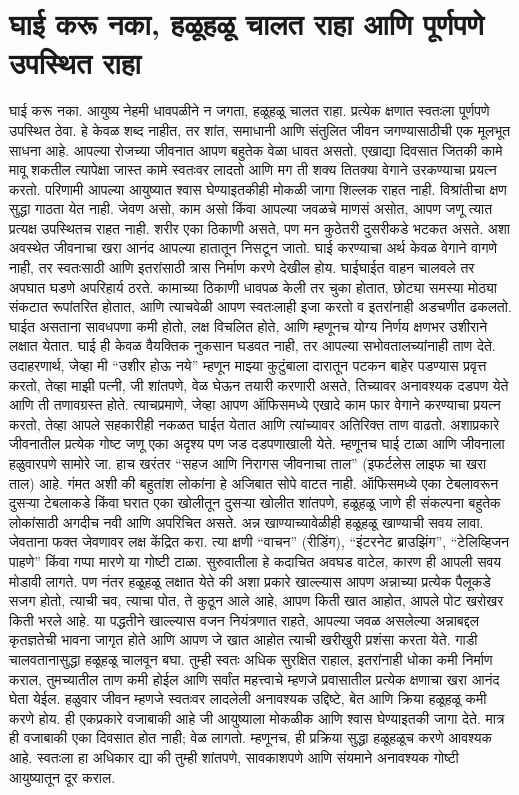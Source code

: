  \chapter{घाई करू नका, हळूहळू चालत राहा आणि पूर्णपणे उपस्थित राहा}
घाई करू नका. आयुष्य नेहमी धावपळीने न जगता, हळूहळू चालत राहा. प्रत्येक क्षणात स्वतःला पूर्णपणे उपस्थित ठेवा. हे केवळ शब्द नाहीत, तर शांत, समाधानी आणि संतुलित जीवन जगण्यासाठीची एक मूलभूत साधना आहे.
आपल्या रोजच्या जीवनात आपण बहुतेक वेळा धावत असतो. एखाद्या दिवसात जितकी कामे मावू शकतील त्यापेक्षा जास्त कामे स्वतःवर लादतो आणि मग ती शक्य तितक्या वेगाने उरकण्याचा प्रयत्न करतो. परिणामी आपल्या आयुष्यात श्वास घेण्याइतकीही मोकळी जागा शिल्लक राहत नाही. विश्रांतीचा क्षण सुद्धा गाठता येत नाही. जेवण असो, काम असो किंवा आपल्या जवळचे माणसं असोत, आपण जणू त्यात प्रत्यक्ष उपस्थितच राहत नाही. शरीर एका ठिकाणी असते, पण मन कुठेतरी दुसरीकडे भटकत असते. अशा अवस्थेत जीवनाचा खरा आनंद आपल्या हातातून निसटून जातो.
घाई करण्याचा अर्थ केवळ वेगाने वागणे नाही, तर स्वतःसाठी आणि इतरांसाठी त्रास निर्माण करणे देखील होय. घाईघाईत वाहन चालवले तर अपघात घडणे अपरिहार्य ठरते. कामाच्या ठिकाणी धावपळ केली तर चुका होतात, छोट्या समस्या मोठ्या संकटात रूपांतरित होतात, आणि त्याचवेळी आपण स्वतःलाही इजा करतो व इतरांनाही अडचणीत ढकलतो. घाईत असताना सावधपणा कमी होतो, लक्ष विचलित होते, आणि म्हणूनच योग्य निर्णय क्षणभर उशीराने लक्षात येतात.
घाई ही केवळ वैयक्तिक नुकसान घडवत नाही, तर आपल्या सभोवतालच्यांनाही ताण देते. उदाहरणार्थ, जेव्हा मी “उशीर होऊ नये” म्हणून माझ्या कुटुंबाला दारातून पटकन बाहेर पडण्यास प्रवृत्त करतो, तेव्हा माझी पत्नी, जी शांतपणे, वेळ घेऊन तयारी करणारी असते, तिच्यावर अनावश्यक दडपण येते आणि ती तणावग्रस्त होते. त्याचप्रमाणे, जेव्हा आपण ऑफिसमध्ये एखादे काम फार वेगाने करण्याचा प्रयत्न करतो, तेव्हा आपले सहकारीही नकळत घाईत येतात आणि त्यांच्यावर अतिरिक्त ताण वाढतो. अशाप्रकारे जीवनातील प्रत्येक गोष्ट जणू एका अदृश्य पण जड दडपणाखाली येते.
म्हणूनच घाई टाळा आणि जीवनाला हळुवारपणे सामोरे जा. हाच खरंतर “सहज आणि निरागस जीवनाचा ताल” (इफर्टलेस लाइफ चा खरा ताल) आहे. गंमत अशी की बहुतांश लोकांना हे अजिबात सोपे वाटत नाही. ऑफिसमध्ये एका टेबलावरून दुसऱ्या टेबलाकडे किंवा घरात एका खोलीतून दुसऱ्या खोलीत शांतपणे, हळूहळू जाणे ही संकल्पना बहुतेक लोकांसाठी अगदीच नवी आणि अपरिचित असते.
अन्न खाण्याच्यावेळीही हळूहळू खाण्याची सवय लावा. जेवताना फक्त जेवणावर लक्ष केंद्रित करा. त्या क्षणी “वाचन” (रीडिंग), “इंटरनेट ब्राउझिंग”, “टेलिव्हिजन पाहणे” किंवा गप्पा मारणे या गोष्टी टाळा. सुरुवातीला हे कदाचित अवघड वाटेल, कारण ही आपली सवय मोडावी लागते. पण नंतर हळूहळू लक्षात येते की अशा प्रकारे खाल्ल्यास आपण अन्नाच्या प्रत्येक पैलूकडे सजग होतो, त्याची चव, त्याचा पोत, ते कुठून आले आहे, आपण किती खात आहोत, आपले पोट खरोखर किती भरले आहे. या पद्धतीने खाल्ल्यास वजन नियंत्रणात राहते, आपल्या जवळ असलेल्या अन्नाबद्दल कृतज्ञतेची भावना जागृत होते आणि आपण जे खात आहोत त्याची खरीखुरी प्रशंसा करता येते.
गाडी चालवतानासुद्धा हळूहळू चालवून बघा. तुम्ही स्वतः अधिक सुरक्षित राहाल, इतरांनाही धोका कमी निर्माण कराल, तुमच्यातील ताण कमी होईल आणि सर्वांत महत्त्वाचे म्हणजे प्रवासातील प्रत्येक क्षणाचा खरा आनंद घेता येईल.
हळुवार जीवन म्हणजे स्वतःवर लादलेली अनावश्यक उद्दिष्टे, बेत आणि क्रिया हळूहळू कमी करणे होय. ही एकप्रकारे वजाबाकी आहे जी आयुष्याला मोकळीक आणि श्वास घेण्याइतकी जागा देते. मात्र ही वजाबाकी एका दिवसात होत नाही; वेळ लागतो. म्हणूनच, ही प्रक्रिया सुद्धा हळूहळूच करणे आवश्यक आहे. स्वतःला हा अधिकार द्या की तुम्ही शांतपणे, सावकाशपणे आणि संयमाने अनावश्यक गोष्टी आयुष्यातून दूर कराल.

